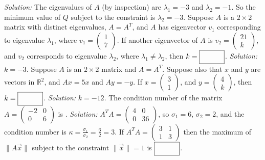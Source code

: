     \ifnum {} {\color{DarkBlue} \textit{Solution:} The eigenvalues of $A$ (by inspection) are $\lambda_1 = -3$ and $\lambda_2=-1$. So the minimum value of $Q$ subject to the constraint is $\lambda_2 = -3$.   } \fi        
\fi 
\ifnum {}
    Suppose $A$ is a $2\times 2$ matrix with distinct eigenvalues, $A=A^T$, and $A$ has eigenvector $v_1$ corresponding to eigenvalue $\lambda_1$, where $v_1 = \begin{pmatrix} 1\\7 \end{pmatrix}$. If another eigenvector of $A$ is $v_2 = \begin{pmatrix} 21\\k\end{pmatrix}$, and $v_2$ corresponds to eigenvalue $\lambda_2$, where $\lambda_1 \ne \lambda_2$, then $k = \framebox{\strut\hspace{1cm}}$. 
    \ifnum {} {\color{DarkBlue} \textit{Solution:} $k=-3$.   } \fi    
\fi 
\ifnum {}
    Suppose $A$ is an $2\times 2$ matrix and $A=A^T$. Suppose also that $x$ and $y$ are vectors in $\mathbb R^2$, and $Ax = 5x$ and $Ay = -y$. If $x=\begin{pmatrix} 3\\1\end{pmatrix}$, and $y=\begin{pmatrix} 4\\k\end{pmatrix}$, then $k=\framebox{\strut\hspace{1cm}}$. 
    \ifnum {} {\color{DarkBlue} \textit{Solution:} $k=-12$.  } \fi    
\fi 
\ifnum {}
    The condition number of the matrix $A=\begin{pmatrix}-2&0\\0&6 \end{pmatrix}$ is 
        \framebox{\strut\hspace{1cm}}.
    \ifnum {} {\color{DarkBlue} \textit{Solution:} $A^TA = \begin{pmatrix} 4&0\\0&36\end{pmatrix}$, so $\sigma_1 = 6$, $\sigma_2 = 2$, and the condition number is $\kappa  = \frac{\sigma_1}{\sigma_2} = \frac 62 = 3$.   } \fi    
\fi 
\ifnum {}
    If $A^TA = \begin{pmatrix} 3&1\\1&3 \end{pmatrix}$ then the maximum of $\|A\vec x\|$ subject to the constraint $\|\vec x\|=1$ is $\framebox{\strut\hspace{1cm}}$.
